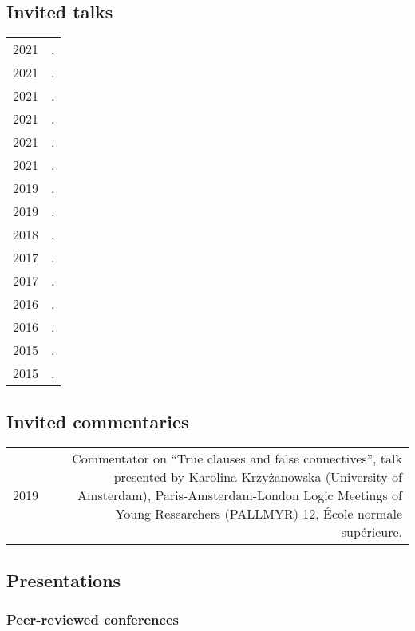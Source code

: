 \documentclass[12pt,letterpaper,twoside]{article}
\makeatletter
\newenvironment{cvsection}{%
  \begin{longtable}[l]{@{}L@{} @{}R@{}}
}{%
  \end{longtable}
}
\makeatother
\begin{document}
\subsection*{Invited talks}

\begin{cvsection}
  2021 & .\\
  2021 & .\\
  2021 & .\\
  2021 & .\\
  2021 & .\\
  2021 & .\\
  2019 & .\\
  2019 & .\\
  2018 & .\\
  2017 & .\\
  2017 & .\\
  2016 & .\\
  2016 & .\\
  2015 & .\\
  2015 & .\\
\end{cvsection}

\subsection*{Invited commentaries}

\begin{cvsection}
  2019 & Commentator on ``True clauses and false connectives'', talk presented by Karolina Krzyżanowska (University of Amsterdam), Paris-Amsterdam-London Logic Meetings of Young Researchers (PALLMYR) 12, École normale supérieure.\\
\end{cvsection}

\subsection*{Presentations}

\subsubsection*{Peer-reviewed conferences}
\end{document}
